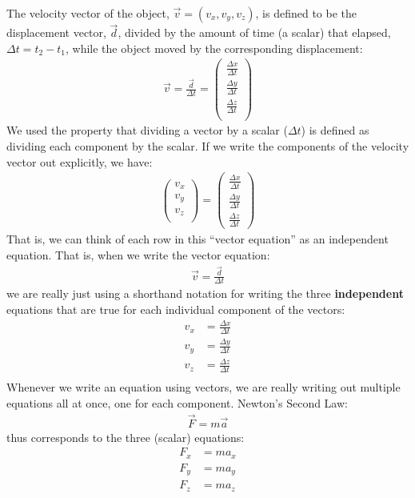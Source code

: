 The velocity vector of the object, $\vec v=(v_x, v_y, v_z)$, is defined to be the displacement vector, $\vec d$, divided by the amount of time (a scalar) that elapsed, $\Delta t=t_2-t_1$, while the object moved by the corresponding displacement:
\begin{align*}
\vec v = \frac{\vec d}{\Delta t}=\begin{pmatrix}
           \frac{\Delta x}{\Delta t} \\
           \frac{\Delta y}{\Delta t} \\
           \frac{\Delta z}{\Delta t} \\
         \end{pmatrix}
\end{align*}
We used the property that dividing a vector by a scalar ($\Delta t$) is defined as dividing each component by the scalar. If we write the components of the velocity vector out explicitly, we have:
\begin{align*}
\begin{pmatrix}
           v_x \\
           v_y \\
           v_z \\
         \end{pmatrix} = \begin{pmatrix}
           \frac{\Delta x}{\Delta t} \\
           \frac{\Delta y}{\Delta t} \\
           \frac{\Delta z}{\Delta t}
         \end{pmatrix}
\end{align*}
That is, we can think of each row in this ``vector equation'' as an independent equation. That is, when we write the vector equation:
\begin{align*}
\vec v = \frac{\vec d}{\Delta t}
\end{align*}
we are really just using a shorthand notation for writing the three \textbf{independent} equations that are true for each individual component of the vectors:
\begin{align*}
v_x &= \frac{\Delta x}{\Delta t} \\
v_y &= \frac{\Delta y}{\Delta t} \\
v_z &= \frac{\Delta z}{\Delta t} \\
\end{align*}
Whenever we write an equation using vectors, we are really writing out multiple equations all at once, one for each component. Newton's Second Law:
\begin{align*}
\vec F = m \vec a
\end{align*}
thus corresponds to the three (scalar) equations:
\begin{align*}
F_x &= ma_x\\
F_y &= ma_y\\
F_z &= ma_z\\
\end{align*}
